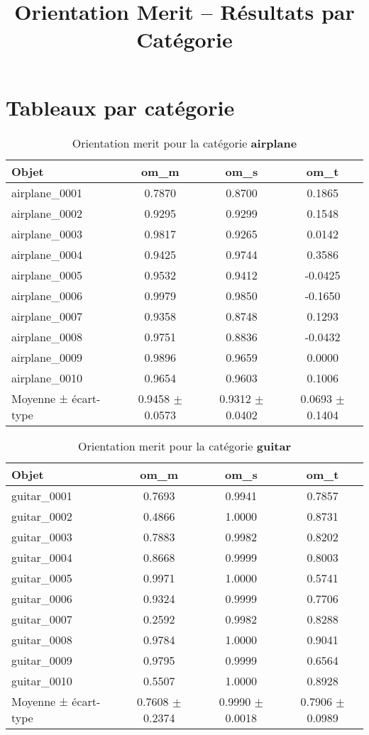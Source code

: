 \documentclass[a4paper,11pt]{article}
\title{Orientation Merit -- Résultats par Catégorie}
\author{}
\date{}
\begin{document}
\maketitle

\section*{Tableaux par catégorie}

\begin{table}[h!]
\centering
\caption{Orientation merit pour la catégorie \textbf{airplane}}
\begin{tabular}{lccc}
\toprule
Objet & om\_m & om\_s & om\_t \\
\midrule
airplane\_0001 & 0.7870 & 0.8700 & 0.1865 \\
airplane\_0002 & 0.9295 & 0.9299 & 0.1548 \\
airplane\_0003 & 0.9817 & 0.9265 & 0.0142 \\
airplane\_0004 & 0.9425 & 0.9744 & 0.3586 \\
airplane\_0005 & 0.9532 & 0.9412 & -0.0425 \\
airplane\_0006 & 0.9979 & 0.9850 & -0.1650 \\
airplane\_0007 & 0.9358 & 0.8748 & 0.1293 \\
airplane\_0008 & 0.9751 & 0.8836 & -0.0432 \\
airplane\_0009 & 0.9896 & 0.9659 & 0.0000 \\
airplane\_0010 & 0.9654 & 0.9603 & 0.1006 \\
\midrule
Moyenne ± écart-type & 0.9458 $\pm$ 0.0573 & 0.9312 $\pm$ 0.0402 & 0.0693 $\pm$ 0.1404 \\
\bottomrule
\end{tabular}
\end{table}


\begin{table}[h!]
\centering
\caption{Orientation merit pour la catégorie \textbf{guitar}}
\begin{tabular}{lccc}
\toprule
Objet & om\_m & om\_s & om\_t \\
\midrule
guitar\_0001 & 0.7693 & 0.9941 & 0.7857 \\
guitar\_0002 & 0.4866 & 1.0000 & 0.8731 \\
guitar\_0003 & 0.7883 & 0.9982 & 0.8202 \\
guitar\_0004 & 0.8668 & 0.9999 & 0.8003 \\
guitar\_0005 & 0.9971 & 1.0000 & 0.5741 \\
guitar\_0006 & 0.9324 & 0.9999 & 0.7706 \\
guitar\_0007 & 0.2592 & 0.9982 & 0.8288 \\
guitar\_0008 & 0.9784 & 1.0000 & 0.9041 \\
guitar\_0009 & 0.9795 & 0.9999 & 0.6564 \\
guitar\_0010 & 0.5507 & 1.0000 & 0.8928 \\
\midrule
Moyenne ± écart-type & 0.7608 $\pm$ 0.2374 & 0.9990 $\pm$ 0.0018 & 0.7906 $\pm$ 0.0989 \\
\bottomrule
\end{tabular}
\end{table}
\end{document}
